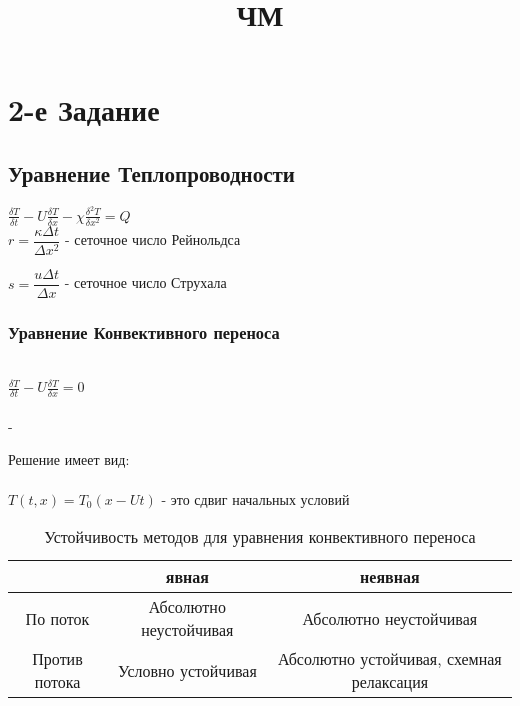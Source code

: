 \documentclass{article}
\title{ЧМ}
\begin{document}
\maketitle

\section{2-е Задание}

\subsection{Уравнение Теплопроводности}

$\frac{\delta T}{\delta t} - U\frac{\delta T}{\delta x} - \chi \frac{\delta^{2} T}{\delta x^{2}} = Q$\\

$r = \dfrac{\kappa \Delta t}{\Delta x^2}$ - сеточное число Рейнольдса

$s = \dfrac{u \Delta t}{\Delta x}$ - сеточное число Струхала

\subsubsection{Уравнение Конвективного переноса}\\

$\frac{\delta T}{\delta t} - U\frac{\delta T}{\delta x} = 0$\\\\ - 

Решение имеет вид: \\\\

$T(t, x) = T_{0}(x - Ut)$ - это сдвиг начальных условий

\begin{table}[h!]
    \centering
    \begin{tabular}{|c|c|c|}
        \hline
          & явная & неявная\\
         \hline
         По поток& Абсолютно неустойчивая  & Абсолютно неустойчивая \\
         \hline
         Против потока & Условно устойчивая& Абсолютно устойчивая, схемная релаксация\\
         \hline
    \end{tabular}
    \caption{Устойчивость методов для уравнения конвективного переноса}
    \label{tab:my_label}
\end{table}\\
\end{document}

